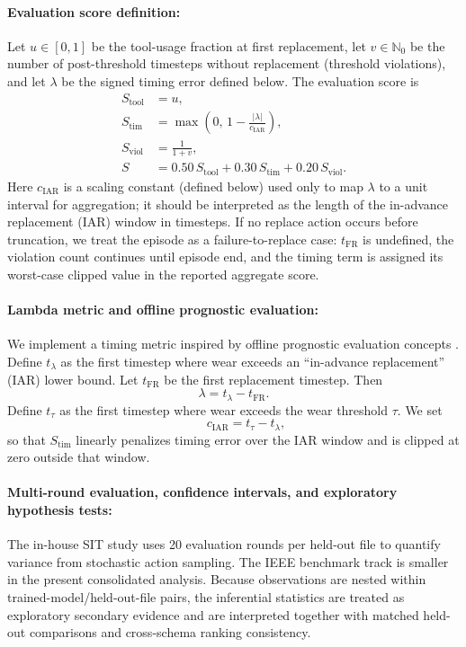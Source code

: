 \documentclass[sn-basic]{sn-jnl} %
\begin{document}
\paragraph{Evaluation score definition:}
Let $u\in[0,1]$ be the tool-usage fraction at first replacement, let $v\in\mathbb{N}_0$ be the number of post-threshold timesteps without replacement (threshold violations), and let $\lambda$ be the signed timing error defined below. The evaluation score is
\begin{align}
	S_{\text{tool}} &= u,\\
	S_{\text{tim}} &= \max\left(0,\,1-\frac{|\lambda|}{c_{\mathrm{IAR}}}\right),\\
	S_{\text{viol}} &= \frac{1}{1+v},\\
	S &= 0.50\,S_{\text{tool}} + 0.30\,S_{\text{tim}} + 0.20\,S_{\text{viol}}.
\end{align}
Here $c_{\mathrm{IAR}}$ is a scaling constant (defined below) used only to map $\lambda$ to a unit interval for aggregation; it should be interpreted as the length of the in-advance replacement (IAR) window in timesteps. If no replace action occurs before truncation, we treat the episode as a failure-to-replace case: $t_{\mathrm{FR}}$ is undefined, the violation count continues until episode end, and the timing term is assigned its worst-case clipped value in the reported aggregate score.

\paragraph{Lambda metric and offline prognostic evaluation:}
We implement a timing metric inspired by offline prognostic evaluation concepts \cite{Saxena2010Metrics}. Define $t_{\lambda}$ as the first timestep where wear exceeds an ``in-advance replacement'' (IAR) lower bound. Let $t_{\mathrm{FR}}$ be the first replacement timestep. Then
\begin{equation}
		\lambda = t_{\lambda} - t_{\mathrm{FR}}.
\end{equation}
Define $t_{\tau}$ as the first timestep where wear exceeds the wear threshold $\tau$. We set
\begin{equation}
\qquad c_{\mathrm{IAR}} = t_{\tau}-t_{\lambda},
\end{equation}
so that $S_{\text{tim}}$ linearly penalizes timing error over the IAR window and is clipped at zero outside that window.

\paragraph{Multi-round evaluation, confidence intervals, and exploratory hypothesis tests:}
The in-house SIT study uses 20 evaluation rounds per held-out file to quantify variance from stochastic action sampling. The IEEE benchmark track is smaller in the present consolidated analysis. Because observations are nested within trained-model/held-out-file pairs, the inferential statistics are treated as exploratory secondary evidence and are interpreted together with matched held-out comparisons and cross-schema ranking consistency.
\end{document}
